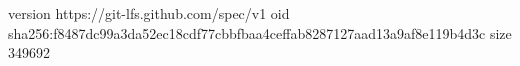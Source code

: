 version https://git-lfs.github.com/spec/v1
oid sha256:f8487dc99a3da52ec18cdf77cbbfbaa4ceffab8287127aad13a9af8e119b4d3c
size 349692
